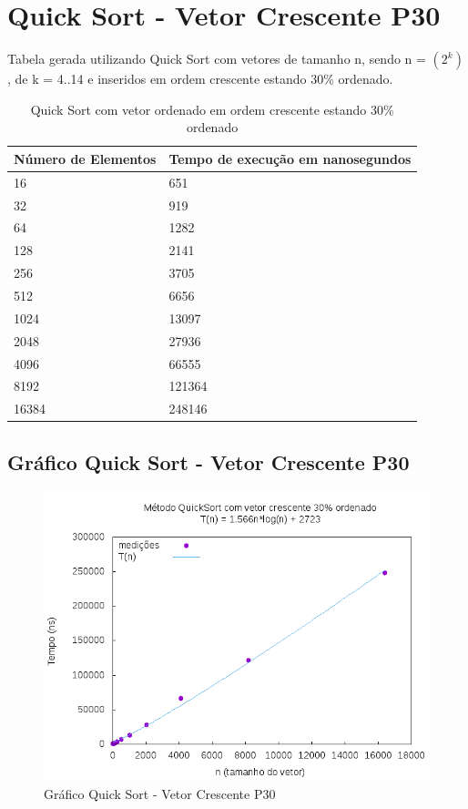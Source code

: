 \documentclass[12pt,a4paper,twoside]{report}
\begin{document}
\section{Quick Sort - Vetor Crescente P30}
Tabela gerada utilizando Quick Sort com vetores de tamanho n, sendo n = $(2^k)$, de k = 4..14 e inseridos em ordem crescente estando 30\% ordenado.
\begin{table}[H]
\centering
\caption{Quick Sort com vetor ordenado em ordem crescente estando 30\% ordenado}
\label{my-label}
\begin{tabular}{|l|l|}
\hline
\multicolumn{1}{|c|}{\textbf{Número de Elementos}} & \multicolumn{1}{c|}{\textbf{Tempo de execução em nanosegundos}} \\ \hline
16 & 651 \\ \hline
32 & 919 \\ \hline
64 & 1282 \\ \hline
128 & 2141 \\ \hline
256 & 3705 \\ \hline
512 & 6656 \\ \hline
1024 & 13097 \\ \hline
2048 & 27936 \\ \hline
4096 & 66555 \\ \hline
8192 & 121364 \\ \hline
16384 & 248146 \\ \hline
\end{tabular}
\end{table}

\subsection{Gráfico Quick Sort - Vetor Crescente P30}
\begin{figure}[H]
    \centering
    \includegraphics[width=0.7\linewidth]{graficos/QuickSort/vIntCrescenteP30/vIntCrescenteP30.png}
  \caption{Gráfico Quick Sort - Vetor Crescente P30}
\end{figure}
\end{document}
